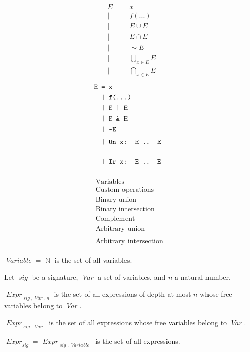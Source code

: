 \documentclass[oneside,12pt]{book}
\theoremstyle{definition}
\theoremstyle{remark}
\newcommand{\tde}{\raisebox{0.5ex}{\texttildelow}}
\newcommand{\ct}{{\sim}} %
\newcommand\var[1]{\mathop{\mathit{#1}}\nolimits}
\newcommand{\sig}{\var{sig}}
\newcommand{\Var}{\var{Var}}
\newcommand{\Variable}{\var{Variable}}
\newcommand{\Expr}{\var{Expr}}
\newcommand{\Nat}{\var{\mathbb{N}}}
\begin{document}
\noindent
\begin{minipage}{\linewidth}
\noindent
\begin{multicols*}{3}
  \noindent
  \begin{align*}
    E =&~x \\
     |&~f(...) \\
     |&~E \cup E \\
     |&~E \cap E \\
     |&~\ct E \\
     |&~\bigcup_{x \in E}E \\
     |&~\bigcap_{x \in E}E
  \end{align*}
  \begin{align*}
      \texttt{E =}&\texttt{ x} \\
      \texttt{|}&\texttt{ f(...)} \\
      \texttt{|}&\texttt{ E | E} \\
      \texttt{|}&\texttt{ E \& E} \\
      \texttt{|}&\texttt{ \tde E} \\
      \texttt{|}&\texttt{ Un x: E .. E} \phantom{\bigcup_E} \\
      \texttt{|}&\texttt{ Ir x: E .. E} \phantom{\bigcup_E}
  \end{align*}
  \begin{align*}
    &\text{Variables} \\
    &\text{Custom operations} \\
    &\text{Binary union} \\
    &\text{Binary intersection} \\
    &\text{Complement} \\
    &\text{Arbitrary union} \phantom{\bigcup_E} \\
    &\text{Arbitrary intersection} \phantom{\bigcup_E}
  \end{align*}
\end{multicols*}
\end{minipage}

\begin{defBox}
  $\Variable = \Nat$ is the set of all variables.

  \medskip \noindent
  Let $\sig$ be a signature, $\Var$ a set of variables, and $n$ a natural number.
  
  \medskip \noindent
  $\Expr_{\sig,\Var,n}$ is the set of all expressions of depth at most $n$ whose
  free variables belong to $\Var$.

  \medskip \noindent $\Expr_{\sig,\Var}$ is the set of all expressions whose
  free variables belong to $\Var$.
  
  \medskip \noindent $\Expr_{\sig} = \Expr_{\sig,\Variable}$ is the set of all
  expressions.
\end{defBox}
\end{document}
